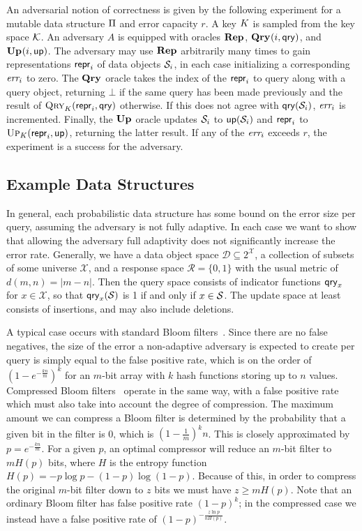 An adversarial notion of correctness is given by the following experiment for a mutable data structure $\mathrm{\Pi}$ and error capacity $r$. A key $K$ is sampled from the key space $\mathcal{K}$. An adversary $A$ is equipped with oracles $\mathbf{Rep}\hspace{0.5pt}$, $\mathbf{Qry}\hspace{0.5pt}(i,\mathsf{qry})$, and $\mathbf{Up}\hspace{0.5pt}(i,\mathsf{up})$. The adversary may use $\mathbf{Rep}\hspace{0.5pt}$ arbitrarily many times to gain representations $\mathsf{repr}_i$ of data objects $\mathcal{S}_i$, in each case initializing a corresponding $\textit{err}_i$ to zero. The $\mathbf{Qry}\hspace{0.5pt}$ oracle takes the index of the $\mathsf{repr}_i$ to query along with a query object, returning $\bot$ if the same query has been made previously and the result of $\textsc{Qry}_K(\mathsf{repr}_i,\mathsf{qry})$ otherwise. If this does not agree with $\mathsf{qry}(\mathcal{S}_i)$, $\textit{err}_i$ is incremented. Finally, the $\mathbf{Up}\hspace{0.5pt}$ oracle updates $\mathcal{S}_i$ to $\mathsf{up}(\mathcal{S}_i)$ and $\mathsf{repr}_i$ to $\textsc{Up}_K(\mathsf{repr}_i,\mathsf{up})$, returning the latter result. If any of the $\textit{err}_i$ exceeds $r$, the experiment is a success for the adversary.

\subsection{Example Data Structures}

In general, each probabilistic data structure has some bound on the error size per query, assuming the adversary is not fully adaptive. In each case we want to show that allowing the adversary full adaptivity does not significantly increase the error rate. Generally, we have a data object space $\mathcal{D} \subseteq 2^\mathcal{X}$, a collection of subsets of some universe $\mathcal{X}$, and a response space $\mathcal{R} = \{0,1\}$ with the usual metric of $d(m,n) = |m-n|$. Then the query space consists of indicator functions $\mathsf{qry}_x$ for $x \in \mathcal{X}$, so that $\mathsf{qry}_x(\mathcal{S})$ is 1 if and only if $x \in \mathcal{S}$. The update space at least consists of insertions, and may also include deletions.

A typical case occurs with standard Bloom filters~\cite{bloomfilter}. Since there are no false negatives, the size of the error a non-adaptive adversary is expected to create per query is simply equal to the false positive rate, which is on the order of $(1-e^{-\frac{kn}{m}})^k$ for an $m$-bit array with $k$ hash functions storing up to $n$ values. Compressed Bloom filters~\cite{xxx} operate in the same way, with a false positive rate which must also take into account the degree of compression. The maximum amount we can compress a Bloom filter is determined by the probability that a given bit in the filter is 0, which is $\left(1-\frac{1}{m}\right)^kn$. This is closely approximated by $p = e^{-\frac{kn}{m}}$. For a given $p$, an optimal compressor will reduce an $m$-bit filter to $mH(p)$ bits, where $H$ is the entropy function $H(p) = -p\log p - (1-p)\log(1-p)$. Because of this, in order to compress the original $m$-bit filter down to $z$ bits we must have $z \ge mH(p)$. Note that an ordinary Bloom filter has false positive rate $(1-p)^k$; in the compressed case we instead have a false positive rate of $(1-p)^{-\frac{z \ln p}{nH(p)}}$.

